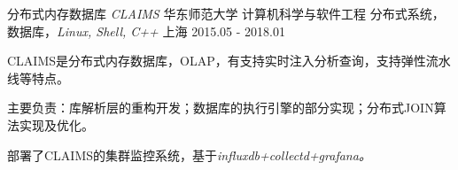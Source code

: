 \begin{cventries}
  \cventry
    {分布式内存数据库  \it{CLAIMS}  } 
    {华东师范大学 \quad 计算机科学与软件工程 \quad 分布式系统，数据库，\it{Linux, Shell, C++}}
    {上海}
    {2015.05 - 2018.01}
    {
      \begin{cvitems}
        	\item {CLAIMS是分布式内存数据库，OLAP，有支持实时注入分析查询，支持弹性流水线等特点。}
        	\item {主要负责：库解析层的重构开发；数据库的执行引擎的部分实现；分布式JOIN算法实现及优化。}
        	\item {部署了CLAIMS的集群监控系统，基于\it{influxdb+collectd+grafana}。}
      \end{cvitems}
    }
\end{cventries}
